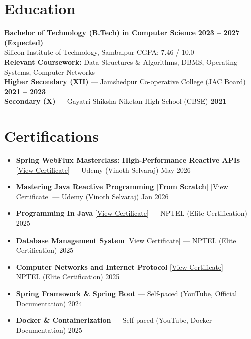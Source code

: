 \documentclass[a4paper,10pt]{article}
\begin{document}
\section{Education}
{\small\color{bodyText}
\textbf{Bachelor of Technology (B.Tech) in Computer Science} \hfill \textbf{2023 -- 2027 (Expected)}\\
Silicon Institute of Technology, Sambalpur \hfill CGPA: 7.46 / 10.0\\[0.2em]
\textbf{Relevant Coursework:} Data Structures \& Algorithms, DBMS, Operating Systems, Computer Networks\\[0.2em]
\textbf{Higher Secondary (XII)} --- Jamshedpur Co-operative College (JAC Board) \hfill \textbf{2021 -- 2023}\\[0.2em]
\textbf{Secondary (X)} --- Gayatri Shiksha Niketan High School (CBSE) \hfill \textbf{2021}
}

\section{Certifications}
{\small\color{bodyText}
\begin{itemize}[leftmargin=1.2em, topsep=2pt, itemsep=1pt, parsep=0pt]
    \item \textbf{Spring WebFlux Masterclass: High-Performance Reactive APIs}
    \href{https://udemy-certificate.s3.amazonaws.com/image/UC-73c69596-afd2-4808-8aa8-d92f109dd95e.jpg?v=1778004091000}{\textcolor{linkBlue}{[View Certificate]}}
    --- Udemy (Vinoth Selvaraj) \hfill May 2026
    \item \textbf{Mastering Java Reactive Programming [From Scratch]}
    \href{https://udemy-certificate.s3.amazonaws.com/image/UC-717014e4-2542-40be-b0f2-6bcce5ec4003.jpg?v=1769866490000}{\textcolor{linkBlue}{[View Certificate]}}
    --- Udemy (Vinoth Selvaraj) \hfill Jan 2026
    \item \textbf{Programming In Java}
    \href{http://ramjeeprasad.online/Programming_In_Java_Ramjee.jpg}{\textcolor{linkBlue}{[View Certificate]}}
    --- NPTEL (Elite Certification) \hfill 2025
    \item \textbf{Database Management System}
    \href{http://ramjeeprasad.online/Data_Base_Management_System_Ramjee.jpg}{\textcolor{linkBlue}{[View Certificate]}}
    --- NPTEL (Elite Certification) \hfill 2025
    \item \textbf{Computer Networks and Internet Protocol}
    \href{http://ramjeeprasad.online/Computer_Networks_and_Internet_Protocol_Ramjee.jpg}{\textcolor{linkBlue}{[View Certificate]}}
    --- NPTEL (Elite Certification) \hfill 2025
    \item \textbf{Spring Framework \& Spring Boot}
    --- Self-paced (YouTube, Official Documentation) \hfill 2024
    \item \textbf{Docker \& Containerization}
    --- Self-paced (YouTube, Docker Documentation) \hfill 2025
\end{itemize}
}
\end{document}
